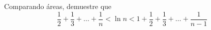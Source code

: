 \item Comparando áreas, demuestre que
    $$\frac{1}{2} + \frac{1}{3} + \dots + \frac{1}{n} < \ln n < 1 + \frac{1}{2} + \frac{1}{3} + \dots + \frac{1}{n - 1}$$
